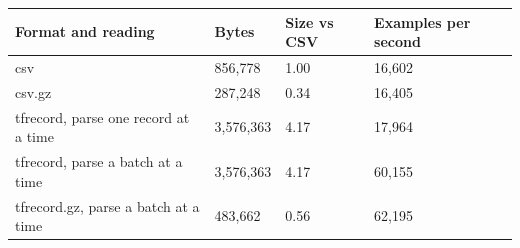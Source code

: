 \begin{tabular}{L{7.0cm}R{2.2cm}R{2.0cm}R{2.6cm}}
\toprule
Format and reading & Bytes & Size vs CSV & Examples per second \\
\midrule
csv & 856,778 & 1.00 & 16,602 \\
csv.gz & 287,248 & 0.34 & 16,405 \\
tfrecord, parse one record at a time & 3,576,363 & 4.17 & 17,964 \\
tfrecord, parse a batch at a time & 3,576,363 & 4.17 & 60,155 \\
tfrecord.gz, parse a batch at a time & 483,662 & 0.56 & 62,195 \\
\bottomrule
\end{tabular}
